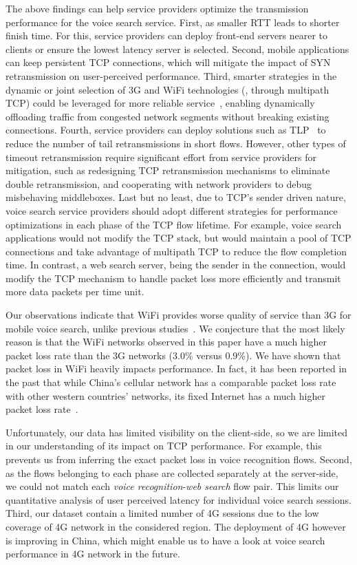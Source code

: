 The above findings can help service providers optimize the transmission performance for the voice search service. First, as smaller RTT leads to shorter finish time. For this, service providers can deploy front-end servers nearer to clients or ensure the lowest latency server is selected. Second, mobile applications can keep persistent TCP connections, which will mitigate the impact of SYN retransmission on user-perceived performance. Third, smarter strategies in the dynamic or joint selection of 3G and WiFi technologies (\eg, through multipath TCP) could be leveraged for more reliable service~\cite{UM-CS-2012-022,Chen:2013:MSM:2504730.2504751}, enabling dynamically offloading traffic from congested network segments without breaking existing connections. Fourth, service providers can deploy solutions such as TLP~\cite{flach2013reducing} to reduce the number of tail retransmissions in short flows. However, other types of timeout retransmission require significant effort from service providers for mitigation, such as redesigning TCP retransmission mechanisms to eliminate double retransmission, and cooperating with network providers to debug misbehaving middleboxes. Last but no least, due to TCP's sender driven nature, voice search service providers should adopt different strategies for performance optimizations in each phase of the TCP flow lifetime. For example, voice search applications would not modify the TCP stack, but would maintain a pool of TCP connections and take advantage of multipath TCP to reduce the flow completion time. In contrast, a web search server, being the sender in the connection, would modify the TCP mechanism to handle packet loss more efficiently and transmit more data packets per time unit.

Our observations indicate that WiFi provides worse quality of service than 3G for mobile voice search, unlike previous studies~\cite{sommers2012cell}. We conjecture that the most likely reason is that the WiFi networks observed in this paper have a much higher packet loss rate than the 3G networks (3.0\% versus 0.9\%). We have shown that packet loss in WiFi heavily impacts performance. In fact, it has been reported in the past that while China's cellular network has a comparable packet loss rate with other western countries' networks, its fixed Internet has a much higher packet loss rate~\cite{HeikkinenB12}.

Unfortunately, our data has limited visibility on the client-side, so we are limited in our understanding of its impact on TCP performance. For example, this prevents us from inferring the exact packet loss in voice recognition flows. Second, as the flows belonging to each phase are collected separately at the server-side, we could not match each \emph{voice recognition}-\emph{web search} flow pair. This limits our quantitative analysis of user perceived latency for individual voice search sessions. Third, our dataset contain a limited number of 4G sessions due to the low coverage of 4G network in the considered region. The deployment of 4G however is improving in China, which might enable us to have a look at voice search performance in 4G network in the future.

